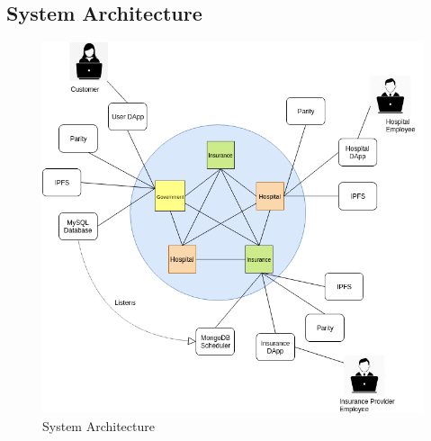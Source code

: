 \subsection{System Architecture}
\begin{figure}[h!]
	\centering
	\includegraphics[width=\linewidth]{Images/SystemArchitecture.png}
	\caption{System Architecture}
\end{figure} 

